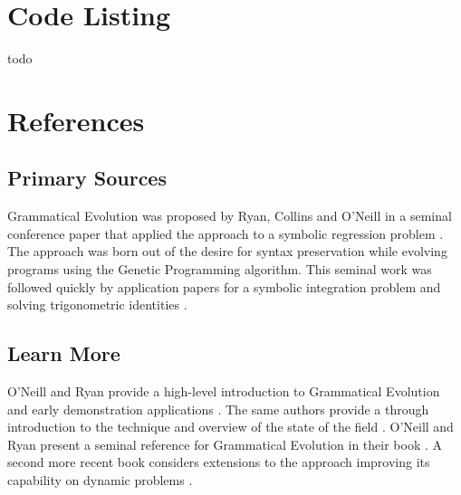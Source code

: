 \documentclass[a4paper, 11pt]{article}
\begin{document}
\section{Code Listing}
\label{sec:code}
todo


\section{References}
\label{sec:references}

% 
% 
\subsection{Primary Sources}
Grammatical Evolution was proposed by Ryan, Collins and O'Neill in a seminal conference paper that applied the approach to a symbolic regression problem \cite{Ryan1998a}. 
The approach was born out of the desire for syntax preservation while evolving programs using the Genetic Programming algorithm.
This seminal work was followed quickly by application papers for a symbolic integration problem \cite{O'Neill1998, O'Neill1998a} and solving trigonometric identities \cite{Ryan1998}.

% 
% 
\subsection{Learn More}
O'Neill and Ryan provide a high-level introduction to Grammatical Evolution and early demonstration applications \cite{O'Neill1999}. The same authors provide a through introduction to the technique and overview of the state of the field \cite{O'Neill2001}.
O'Neill and Ryan present a seminal reference for Grammatical Evolution in their book \cite{O'Neill2003}. A second more recent book considers extensions to the approach improving its capability on dynamic problems \cite{Dempsey2009}. 
\end{document}
